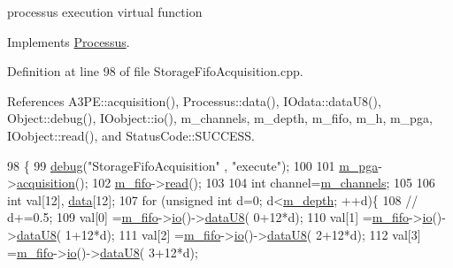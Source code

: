 processus execution virtual function 

Implements \hyperlink{classProcessus_a63767a63a1fb0055c5aa45b21a4a5d58}{Processus}.



Definition at line 98 of file Storage\+Fifo\+Acquisition.\+cpp.



References A3\+P\+E\+::acquisition(), Processus\+::data(), I\+Odata\+::data\+U8(), Object\+::debug(), I\+Oobject\+::io(), m\+\_\+channels, m\+\_\+depth, m\+\_\+fifo, m\+\_\+h, m\+\_\+pga, I\+Oobject\+::read(), and Status\+Code\+::\+S\+U\+C\+C\+E\+SS.


\begin{DoxyCode}
98                                              \{
99   \hyperlink{classObject_aac010553f022165573714b7014a15f0d}{debug}(\textcolor{stringliteral}{"StorageFifoAcquisition"} , \textcolor{stringliteral}{"execute"});
100 
101   \hyperlink{classStorageFifoAcquisition_a30a158fb750e33fbec4f2f9ee8cbb68f}{m\_pga}->\hyperlink{classA3PE_a035886b99761cc4f3c342ff0b4e44f59}{acquisition}();
102   \hyperlink{classStorageFifoAcquisition_a5405a161dc3983274ccdfdf83687d98d}{m\_fifo}->\hyperlink{classIOobject_aa07610c11963b1db6710e3c76ceea456}{read}();
103     
104   \textcolor{keywordtype}{int} channel=\hyperlink{classStorageFifoAcquisition_ae3563f586533ac15f48c7f9c8fea3e7f}{m\_channels};
105 
106   \textcolor{keywordtype}{int} val[12], \hyperlink{classProcessus_a16e45f329fbce935aeef0ff3cb508228}{data}[12];
107   \textcolor{keywordflow}{for} (\textcolor{keywordtype}{unsigned} \textcolor{keywordtype}{int} d=0; d<\hyperlink{classStorageFifoAcquisition_a6bebf76cce0ccaae599c844a69ebd19d}{m\_depth}; ++d)\{
108     \textcolor{comment}{//      d+=0.5;}
109     val[0] =\hyperlink{classStorageFifoAcquisition_a5405a161dc3983274ccdfdf83687d98d}{m\_fifo}->\hyperlink{classIOobject_af04fb94137c3d86849f478ac5afab5d1}{io}()->\hyperlink{classIOdata_a75e9c318dbac3a39402179070943d4bc}{dataU8}( 0+12*d);
110     val[1] =\hyperlink{classStorageFifoAcquisition_a5405a161dc3983274ccdfdf83687d98d}{m\_fifo}->\hyperlink{classIOobject_af04fb94137c3d86849f478ac5afab5d1}{io}()->\hyperlink{classIOdata_a75e9c318dbac3a39402179070943d4bc}{dataU8}( 1+12*d);
111     val[2] =\hyperlink{classStorageFifoAcquisition_a5405a161dc3983274ccdfdf83687d98d}{m\_fifo}->\hyperlink{classIOobject_af04fb94137c3d86849f478ac5afab5d1}{io}()->\hyperlink{classIOdata_a75e9c318dbac3a39402179070943d4bc}{dataU8}( 2+12*d);
112     val[3] =\hyperlink{classStorageFifoAcquisition_a5405a161dc3983274ccdfdf83687d98d}{m\_fifo}->\hyperlink{classIOobject_af04fb94137c3d86849f478ac5afab5d1}{io}()->\hyperlink{classIOdata_a75e9c318dbac3a39402179070943d4bc}{dataU8}( 3+12*d);

\end{DoxyCode}
